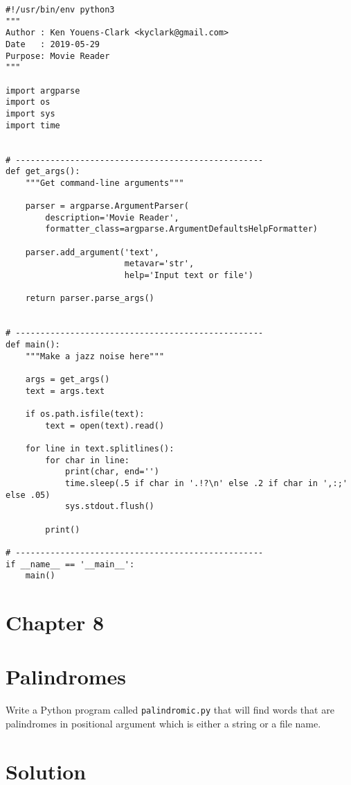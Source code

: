 \documentclass[]{article}
\begin{document}
\begin{verbatim}
#!/usr/bin/env python3
"""
Author : Ken Youens-Clark <kyclark@gmail.com>
Date   : 2019-05-29
Purpose: Movie Reader
"""

import argparse
import os
import sys
import time


# --------------------------------------------------
def get_args():
    """Get command-line arguments"""

    parser = argparse.ArgumentParser(
        description='Movie Reader',
        formatter_class=argparse.ArgumentDefaultsHelpFormatter)

    parser.add_argument('text',
                        metavar='str',
                        help='Input text or file')

    return parser.parse_args()


# --------------------------------------------------
def main():
    """Make a jazz noise here"""

    args = get_args()
    text = args.text

    if os.path.isfile(text):
        text = open(text).read()

    for line in text.splitlines():
        for char in line:
            print(char, end='')
            time.sleep(.5 if char in '.!?\n' else .2 if char in ',:;' else .05)
            sys.stdout.flush()

        print()

# --------------------------------------------------
if __name__ == '__main__':
    main()
\end{verbatim}

\pagebreak

\hypertarget{chapter-8}{%
\section{Chapter 8}\label{chapter-8}}

\hypertarget{palindromes}{%
\section{Palindromes}\label{palindromes}}

Write a Python program called \texttt{palindromic.py} that will find
words that are palindromes in positional argument which is either a
string or a file name.

\pagebreak

\hypertarget{solution-7}{%
\section{Solution}\label{solution-7}}
\end{document}
